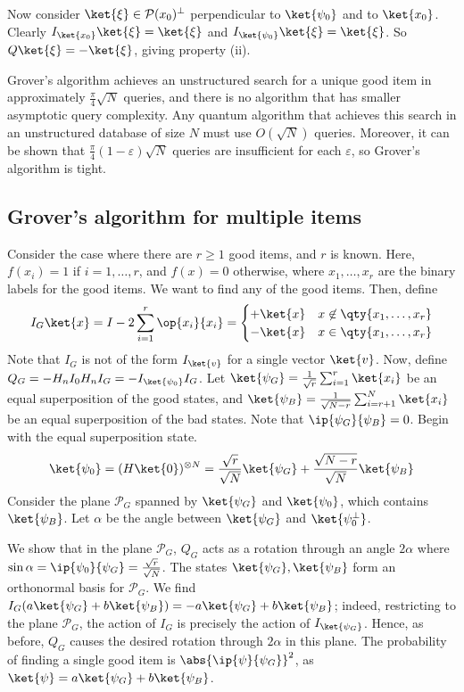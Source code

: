 Now consider $\ket{\xi} \in \mathcal P(x_0)^\perp$ perpendicular to $\ket{\psi_0}$ and to $\ket{x_0}$.
Clearly $I_{\ket{x_0}} \ket{\xi} = \ket{\xi}$ and $I_{\ket{\psi_0}} \ket{\xi} = \ket{\xi}$.
So $Q \ket{\xi} = -\ket{\xi}$, giving property (ii).

Grover's algorithm achieves an unstructured search for a unique good item in approximately $\frac{\pi}{4}\sqrt{N}$ queries, and there is no algorithm that has smaller asymptotic query complexity.
Any quantum algorithm that achieves this search in an unstructured database of size $N$ must use $O(\sqrt{N})$ queries.
Moreover, it can be shown that $\frac{\pi}{4} (1 - \varepsilon) \sqrt{N}$ queries are insufficient for each $\varepsilon$, so Grover's algorithm is tight.

\subsection{Grover's algorithm for multiple items}
Consider the case where there are $r \geq 1$ good items, and $r$ is known.
Here, $f(x_i) = 1$ if $i = 1, \dots, r$, and $f(x) = 0$ otherwise, where $x_1, \dots, x_r$ are the binary labels for the good items.
We want to find any of the good items.
Then, define
\[ I_G \ket{x} = I - 2\sum_{i=1}^r \op{x_i}{x_i} = \begin{cases}
    +\ket{x} & x \not\in \qty{x_1, \dots, x_r} \\
    -\ket{x} & x \in \qty{x_1, \dots, x_r}
\end{cases} \]
Note that $I_G$ is not of the form $I_{\ket{v}}$ for a single vector $\ket{v}$.
Now, define $Q_G = -H_n I_0 H_n I_G = -I_{\ket{\psi_0}} I_G$.
Let $\ket{\psi_G} = \frac{1}{\sqrt{r}} \sum_{i=1}^r \ket{x_i}$ be an equal superposition of the good states, and $\ket{\psi_B} = \frac{1}{\sqrt{N-r}} \sum_{i=r+1}^N \ket{x_i}$ be an equal superposition of the bad states.
Note that $\ip{\psi_G}{\psi_B} = 0$.
Begin with the equal superposition state.
\[ \ket{\psi_0} = (H\ket{0})^{\otimes N} = \frac{\sqrt{r}}{\sqrt{N}} \ket{\psi_G} + \frac{\sqrt{N-r}}{\sqrt{N}} \ket{\psi_B} \]
Consider the plane $\mathcal P_G$ spanned by $\ket{\psi_G}$ and $\ket{\psi_0}$, which contains $\ket{\psi_B}$.
Let $\alpha$ be the angle between $\ket{\psi_G}$ and $\ket{\psi_0^\perp}$.

We show that in the plane $\mathcal P_G$, $Q_G$ acts as a rotation through an angle $2\alpha$ where $\sin \alpha = \ip{\psi_0}{\psi_G} = \frac{\sqrt{r}}{\sqrt{N}}$.
The states $\ket{\psi_G}, \ket{\psi_B}$ form an orthonormal basis for $\mathcal P_G$.
We find $I_G (a \ket{\psi_G} + b \ket{\psi_B}) = -a \ket{\psi_G} + b \ket{\psi_B}$; indeed, restricting to the plane $\mathcal P_G$, the action of $I_G$ is precisely the action of $I_{\ket{\psi_G}}$.
Hence, as before, $Q_G$ causes the desired rotation through $2\alpha$ in this plane.
The probability of finding a single good item is $\abs{\ip{\psi}{\psi_G}}^2$, as $\ket{\psi} = a \ket{\psi_G} + b \ket{\psi_B}$.

